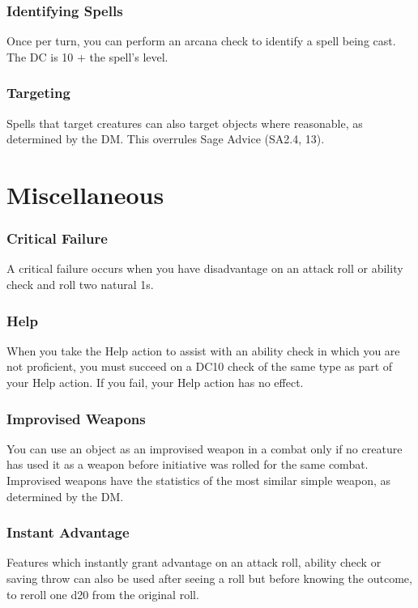 \documentclass[letterpaper,twocolumn,openany,nodeprecatedcode]{dndbook}
\begin{document}
\subsubsection{Identifying Spells}
Once per turn, you can perform an arcana check to identify a spell being cast. The DC is 10 + the spell's level.


\subsubsection{Targeting}
Spells that target creatures can also target objects where reasonable, as determined by the DM. This overrules Sage Advice (SA2.4, 13).




\section{Miscellaneous}

\subsubsection{Critical Failure}
A critical failure occurs when you have disadvantage on an attack roll or ability check and roll two natural 1s.

\subsubsection{Help}
When you take the Help action to assist with an ability check in which you are not proficient, you must succeed on a DC10 check of the same type as part of your Help action. If you fail, your Help action has no effect.

\subsubsection{Improvised Weapons}
You can use an object as an improvised weapon in a combat only if no creature has used it as a weapon before initiative was rolled for the same combat. Improvised weapons have the statistics of the most similar simple weapon, as determined by the DM.

\subsubsection{Instant Advantage}
Features which instantly grant advantage on an attack roll, ability check or saving throw can also be used after seeing a roll but before knowing the outcome, to reroll one d20 from the original roll.
\end{document}
